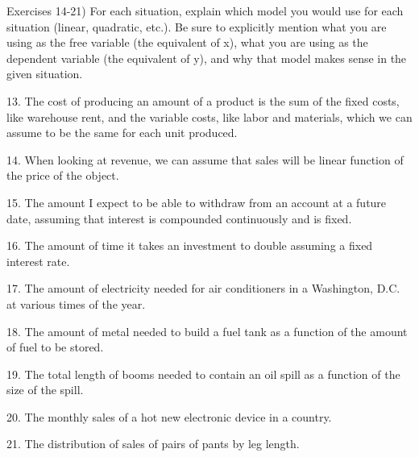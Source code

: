 \documentclass[10pt,]{book}
\theoremstyle{plain}
\theoremstyle{definition}
\theoremstyle{definition}
\begin{document}
\begin{exerciselist}
\par\smallskip
\par
Exercises 14-21) For each situation, explain which model you would use for each situation (linear, quadratic, etc.).  Be sure to explicitly mention what you are using as the free variable (the equivalent of x), what you are using as the dependent variable (the equivalent of y), and why that model makes sense in the given situation.%
\item[13.]\hypertarget{exercise-33}{} The cost of producing an amount of a product is the sum of the fixed costs, like warehouse rent, and the variable costs, like labor and materials, which we can assume to be the same for each unit produced.
%
\par\smallskip
\item[14.]\hypertarget{exercise-34}{} When looking at revenue, we can assume that sales will be linear function of the price of the object.
%
\par\smallskip
\item[15.]\hypertarget{exercise-35}{} The amount I expect to be able to withdraw from an account at a future date, assuming that interest is compounded continuously and is fixed.
%
\par\smallskip
\item[16.]\hypertarget{exercise-36}{} The amount of time it takes an investment to double assuming a fixed interest rate.
%
\par\smallskip
\item[17.]\hypertarget{exercise-37}{} The amount of electricity needed for air conditioners in a Washington, D.C. at various times of the year.
%
\par\smallskip
\item[18.]\hypertarget{exercise-38}{} The amount of metal needed to build a fuel tank as a function of the amount of fuel to be stored.
%
\par\smallskip
\item[19.]\hypertarget{exercise-39}{} The total length of booms needed to contain an oil spill as a function of the size of the spill.
%
\par\smallskip
\item[20.]\hypertarget{exercise-40}{} The monthly sales of a hot new electronic device in a country.%
\par\smallskip
\item[21.]\hypertarget{exercise-41}{} The distribution of sales of pairs of pants by leg length.%
\par\smallskip
\end{exerciselist}
\typeout{************************************************}
\typeout{************************************************}
\end{document}
